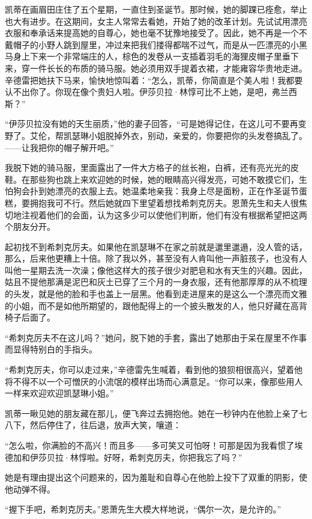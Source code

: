 \par 凯蒂在画眉田庄住了五个星期，一直住到圣诞节。那时候，她的脚踝已痊愈，举止也大有进步。在这期间，女主人常常去看她，开始了她的改革计划。先试试用漂亮衣服和奉承话来提高她的自尊心，她也毫不犹豫地接受了。因此，她不再是一个不戴帽子的小野人跳到屋里，冲过来把我们搂得都喘不过气，而是从一匹漂亮的小黑马身上下来一个非常端庄的人，棕色的发卷从一支插着羽毛的海狸皮帽子里垂下来，穿一件长长的布质的骑马服。她必须用双手提着衣裙，才能雍容华贵地走进。辛德雷把她扶下马来，愉快地惊叫着：“怎么，凯蒂，你简直是个美人啦！我都要认不出你了。你现在像个贵妇人啦。伊莎贝拉·林惇可比不上她，是吧，弗兰西斯？”
\par “伊莎贝拉没有她的天生丽质，”他的妻子回答，“可是她得记住，在这儿可不要再变野了。艾伦，帮凯瑟琳小姐脱掉外衣，别动，亲爱的，你要把你的头发卷搞乱了。——让我把你的帽子解开吧。”
\par 我脱下她的骑马服，里面露出了一件大方格子的丝长袍，白裤，还有亮光光的皮鞋。在那些狗也跳上来欢迎她的时候，她的眼睛高兴得发亮，可她不敢摸它们，生怕狗会扑到她漂亮的衣服上去。她温柔地亲我：我身上尽是面粉，正在作圣诞节蛋糕，要拥抱我可不行。然后她就四下里望着想找希刺克厉夫。恩萧先生和夫人很焦切地注视着他们的会面，认为这多少可以使他们判断，他们有没有根据希望把这两个朋友分开。
\par 起初找不到希刺克厉夫。如果他在凯瑟琳不在家之前就是邋里邋遢，没人管的话，那么，后来他更糟上十倍。除了我以外，甚至没有人肯叫他一声脏孩子，也没有人叫他一星期去洗一次澡；像他这样大的孩子很少对肥皂和水有天生的兴趣。因此，姑且不提他那满是泥巴和灰土已穿了三个月的一身衣服，还有他那厚厚的从不梳理的头发，就是他的脸和手也盖上一层黑。他看到走进屋来的是这么一个漂亮而文雅的小姐，而不是如他所期望的，跟他配得上的一个披头散发的人，他只好藏在高背椅子后面了。
\par “希刺克厉夫不在这儿吗？”她问，脱下她的手套，露出了她那由于呆在屋里不作事而显得特别白的手指头。
\par “希刺克厉夫，你可以走过来，”辛德雷先生喊着，看到他的狼狈相很高兴，望着他将不得不以一个可憎厌的小流氓的模样出场而心满意足。“你可以来，像那些用人一样来欢迎欢迎凯瑟琳小姐。”
\par 凯蒂一瞅见她的朋友藏在那儿，便飞奔过去拥抱他。她在一秒钟内在他脸上亲了七八下，然后停住了，往后退，放声大笑，嚷道：
\par “怎么啦，你满脸的不高兴！而且多——多可笑又可怕呀！可那是因为我看惯了埃德加和伊莎贝拉·林惇啦。好呀，希刺克厉夫，你把我忘了吗？”
\par 她是有理由提出这个问题来的，因为羞耻和自尊心在他脸上投下了双重的阴影，使他动弹不得。
\par “握下手吧，希刺克厉夫。”恩萧先生大模大样地说，“偶尔一次，是允许的。”
